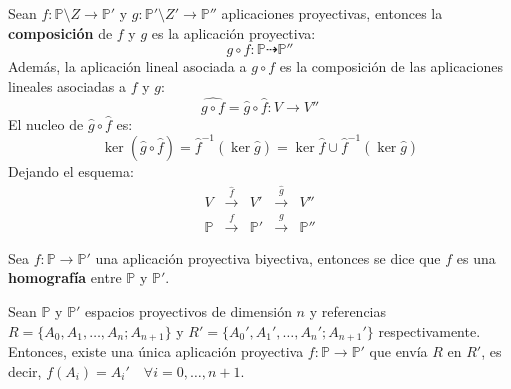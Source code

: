 \begin{definición}
    Sean $f:\mathbb{P} \setminus Z \to \mathbb{P}'$ y $g:\mathbb{P}' \setminus Z' \to \mathbb{P}''$ aplicaciones proyectivas, entonces la \textbf{composición} de $f$ y $g$ es la aplicación proyectiva:
    \[
        g \circ f : \mathbb{P} \dashrightarrow \mathbb{P}''
    \]
    Además, la aplicación lineal asociada a $g \circ f$ es la composición de las aplicaciones lineales asociadas a $f$ y $g$:
    \[
        \hat{g \circ f} = \hat{g} \circ \hat{f} : V \to V''
    \]
    El nucleo de $\hat{g} \circ \hat{f}$ es:
    \[
    \ker(\hat{g} \circ \hat{f}) = \hat{f}^{-1}(\ker \hat{g}) = \ker \hat{f} \cup \hat{f}^{-1}(\ker \hat{g})
    \]
    Dejando el esquema:
    \[
        \begin{matrix}
            V & \xrightarrow{\hat{f}} & V' & \xrightarrow{\hat{g}} & V'' \\
            \mathbb{P} & \xrightarrow{f} & \mathbb{P}' & \xrightarrow{g} & \mathbb{P}''
        \end{matrix}
    \]
\end{definición}


\begin{definición}[homografías]
    Sea $f:\mathbb{P} \to \mathbb{P}'$ una aplicación proyectiva biyectiva, entonces se dice que $f$ es una \textbf{homografía} entre $\mathbb{P}$ y $\mathbb{P}'$.
\end{definición}

\begin{teorema}
    Sean $\mathbb{P}$ y $\mathbb{P}'$ espacios proyectivos de dimensión $n$ y referencias $R=\{A_0, A_1, \ldots, A_n ; A_{n+1}\}$ y $R'=\{A_0', A_1', \ldots, A_n' ; A_{n+1}'\}$ respectivamente. Entonces, existe una única aplicación proyectiva $f:\mathbb{P} \to \mathbb{P}'$ que envía $R$ en $R'$, es decir, $f(A_i) = A_i' \quad \forall i = 0, \ldots, n+1$.\\ 
\end{teorema}


